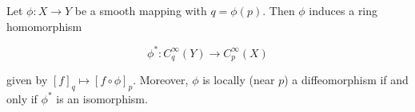 Let $\phi: X \to Y$ be a smooth mapping with $q = \phi(p)$. Then $\phi$ induces a ring homomorphism

$$\phi^*: C_q^\infty(Y) \to C_p^\infty(X)$$

given by $[f]_q \mapsto [f \circ \phi]_p$. Moreover, $\phi$ is locally (near $p$) a diffeomorphism if and only if $\phi^*$ is an isomorphism.
